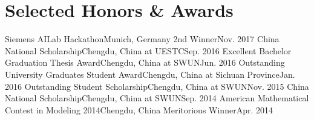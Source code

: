 \section{\textbf{Selected Honors \& Awards}}
  \resumeSubHeadingListStart
  \resumeSubheading
        {Siemens AILab Hackathon}{Munich, Germany}
        {2nd Winner}{Nov. 2017}
    \resumeSubheading
        {China National Scholarship}{Chengdu, China}
        {at UESTC}{Sep. 2016}
    \resumeSubheading
        {Excellent Bachelor Graduation Thesis Award}{Chengdu, China}
        {at SWUN}{Jun. 2016}
    \resumeSubheading
        {Outstanding University Graduates Student Award}{Chengdu, China}
        {at Sichuan Province}{Jan. 2016}
    \resumeSubheading
        {Outstanding Student Scholarship}{Chengdu, China}
        {at SWUN}{Nov. 2015}
    \resumeSubheading
        {China National Scholarship}{Chengdu, China}
        {at SWUN}{Sep. 2014}
    \resumeSubheading
        {American Mathematical Contest in Modeling 2014}{Chengdu, China}
        {Meritorious Winner}{Apr. 2014}
  \resumeSubHeadingListEnd